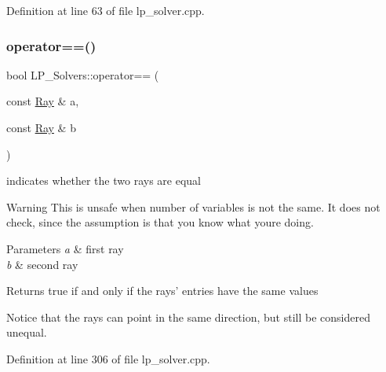 Definition at line 63 of file lp\+\_\+solver.\+cpp.

\mbox{\label{namespace_l_p___solvers_abda74dc37387f370329de0f20b63f124}} 
\subsubsection{\texorpdfstring{operator==()}{operator==()}\hspace{0.1cm}{\footnotesize\ttfamily [3/3]}}
{\footnotesize\ttfamily bool L\+P\+\_\+\+Solvers\+::operator== (\begin{DoxyParamCaption}\item[{const \hyperlink{group___c_l_s_solvers_class_l_p___solvers_1_1_ray}{Ray} \&}]{a,  }\item[{const \hyperlink{group___c_l_s_solvers_class_l_p___solvers_1_1_ray}{Ray} \&}]{b }\end{DoxyParamCaption})}



indicates whether the two rays are equal 

\begin{DoxyWarning}{Warning}
This is unsafe when number of variables is not the same. It does not check, since the assumption is that you know what you\textquotesingle{}re doing. 
\end{DoxyWarning}

\begin{DoxyParams}{Parameters}
{\em a} & first ray \\
\hline
{\em b} & second ray \\
\hline
\end{DoxyParams}
\begin{DoxyReturn}{Returns}
{\ttfamily true} if and only if the rays' entries have the same values
\end{DoxyReturn}
Notice that the rays can point in the same direction, but still be considered unequal. 

Definition at line 306 of file lp\+\_\+solver.\+cpp.

\mbox{\label{namespace_l_p___solvers_a7e1accee51d4f9339ef83bf93d653544}} 
